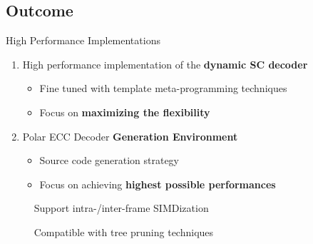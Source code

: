 \subsection[Outcome]{Outcome}

\begin{frame}{High Performance Implementations}
  \vfill
  \begin{enumerate}
    \item High performance implementation of the \textbf{dynamic SC decoder}
    \begin{itemize}
      \item Fine tuned with template meta-programming techniques
      \item Focus on \textbf{maximizing the flexibility}
    \end{itemize}
    \pause
    \vspace{0.3cm}
    \item Polar ECC Decoder \textbf{Generation Environment}
    \begin{itemize}
      \item Source code generation strategy
      \item Focus on achieving \textbf{highest possible performances}
    \end{itemize}
  \end{enumerate}
  \vfill
  \pause

  \vspace*{.5em}
  ~~~~~{\color{bleuUni}\Large\MVRightarrow} Support intra-/inter-frame SIMDization %

  \vspace*{.5em}
  ~~~~~{\color{bleuUni}\Large\MVRightarrow} Compatible with tree pruning techniques

  \vfill
\end{frame}


